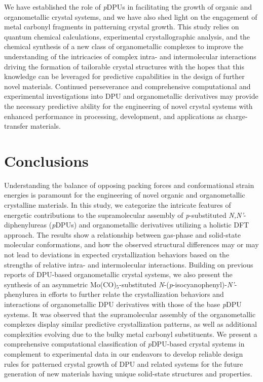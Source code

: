 We have established the role of \textit{p}DPUs in facilitating the growth of organic and organometallic crystal systems, and we have also shed light on the engagement of metal carbonyl fragments in patterning crystal growth. This study relies on quantum chemical calculations, experimental crystallographic analysis, and the chemical synthesis of a new class of organometallic complexes to improve the understanding of the intricacies of complex intra- and intermolecular interactions driving the formation of tailorable crystal structures with the hopes that this knowledge can be leveraged for predictive capabilities in the design of further novel materials. Continued perseverance and comprehensive computational and experimental investigations into DPU and organometallic derivatives may provide the necessary predictive ability for the engineering of novel crystal systems with enhanced performance in processing, development, and applications as charge-transfer materials.

\section{Conclusions}
Understanding the balance of opposing packing forces and conformational strain energies is paramount for the engineering of novel organic and organometallic crystalline materials. In this study, we categorize the intricate features of energetic contributions to the supramolecular assembly of \textit{p}-substituted \textit{N,N'}-diphenylureas (\textit{p}DPUs) and organometallic derivatives utilizing a holistic DFT approach. The results show a relationship between gas-phase and solid-state molecular conformations, and how the observed structural differences may or may not lead to deviations in expected crystallization behaviors based on the strengths of relative intra- and intermolecular interactions. Building on previous reports of DPU-based organometallic crystal systems, we also present the synthesis of an asymmetric Mo(CO)$_{5}$-substituted \textit{N}-(\textit{p}-isocyanophenyl)-\textit{N'}-phenylurea in efforts to further relate the crystallization behaviors and interactions of organometallic DPU derivatives with those of the base \textit{p}DPU systems. It was observed that the supramolecular assembly of the organometallic complexes display similar predictive crystallization patterns, as well as additional complexities evolving due to the bulky metal carbonyl substituents. We present a comprehensive computational classification of \textit{p}DPU-based crystal systems in complement to experimental data in our endeavors to develop reliable design rules for patterned crystal growth of DPU and related systems for the future generation of new materials having unique solid-state structures and properties.

